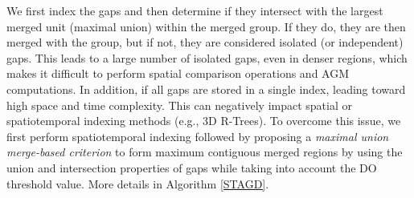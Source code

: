 \documentclass[acmsmall]{acmart}
\begin{document}
We first index the gaps and then determine if they intersect with the largest merged unit (maximal union) within the merged group. If they do, they are then merged with the group, but if not, they are considered isolated (or independent) gaps. This leads to a large number of isolated gaps, even in denser regions, which makes it difficult to perform spatial comparison operations and AGM computations. In addition, if all gaps are stored in a single index, leading toward high space and time complexity. This can negatively impact spatial or spatiotemporal indexing methods (e.g., 3D R-Trees). To overcome this issue, we first perform spatiotemporal indexing followed by proposing a \textit{maximal union merge-based criterion} to form maximum contiguous merged regions by using the union and intersection properties of gaps while taking into account the DO threshold value. More details in Algorithm \ref{STAGD}.




\end{document}
